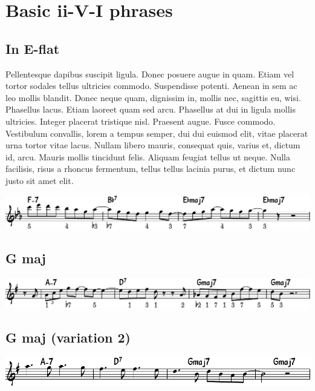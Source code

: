 \documentclass[11pt]{article}
\begin{document}
\section*{Basic ii-V-I phrases}
\label{sec:orgd56d203}
\subsection*{In E-flat}
\label{sec:orgeef5ef9}

Pellentesque dapibus suscipit ligula.  Donec posuere augue in quam.  Etiam vel tortor sodales tellus ultricies commodo.  Suspendisse potenti.  Aenean in sem ac leo mollis blandit.  Donec neque quam, dignissim in, mollis nec, sagittis eu, wisi.  Phasellus lacus.  Etiam laoreet quam sed arcu.  Phasellus at dui in ligula mollis ultricies.  Integer placerat tristique nisl.  Praesent augue.  Fusce commodo.  Vestibulum convallis, lorem a tempus semper, dui dui euismod elit, vitae placerat urna tortor vitae lacus.  Nullam libero mauris, consequat quis, varius et, dictum id, arcu.  Mauris mollis tincidunt felis.  Aliquam feugiat tellus ut neque.  Nulla facilisis, risus a rhoncus fermentum, tellus tellus lacinia purus, et dictum nunc justo sit amet elit.


\begin{center}
\includegraphics[width=.9\linewidth]{e-flat.pdf}
\end{center}

\subsection*{G maj}
\label{sec:org47061b7}
\begin{center}
\includegraphics[width=.9\linewidth]{g_maj.pdf}
\end{center}

\subsection*{G maj (variation 2)}
\label{sec:org95abae9}
\begin{center}
\includegraphics[width=.9\linewidth]{g_maj_v2.pdf}
\end{center}
\end{document}
